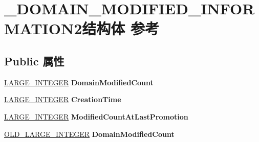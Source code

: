 \hypertarget{struct___d_o_m_a_i_n___m_o_d_i_f_i_e_d___i_n_f_o_r_m_a_t_i_o_n2}{}\section{\+\_\+\+D\+O\+M\+A\+I\+N\+\_\+\+M\+O\+D\+I\+F\+I\+E\+D\+\_\+\+I\+N\+F\+O\+R\+M\+A\+T\+I\+O\+N2结构体 参考}
\label{struct___d_o_m_a_i_n___m_o_d_i_f_i_e_d___i_n_f_o_r_m_a_t_i_o_n2}
\subsection*{Public 属性}
\begin{DoxyCompactItemize}
\item 
\mbox{\label{struct___d_o_m_a_i_n___m_o_d_i_f_i_e_d___i_n_f_o_r_m_a_t_i_o_n2_a7c1eada0462e6a7104e068ecc3f34dbd}} 
\hyperlink{union___l_a_r_g_e___i_n_t_e_g_e_r}{L\+A\+R\+G\+E\+\_\+\+I\+N\+T\+E\+G\+ER} {\bfseries Domain\+Modified\+Count}
\item 
\mbox{\label{struct___d_o_m_a_i_n___m_o_d_i_f_i_e_d___i_n_f_o_r_m_a_t_i_o_n2_a9a89897af1314d64237f343ab8f1d6cf}} 
\hyperlink{union___l_a_r_g_e___i_n_t_e_g_e_r}{L\+A\+R\+G\+E\+\_\+\+I\+N\+T\+E\+G\+ER} {\bfseries Creation\+Time}
\item 
\mbox{\label{struct___d_o_m_a_i_n___m_o_d_i_f_i_e_d___i_n_f_o_r_m_a_t_i_o_n2_a7f5bb9fc27370f50e2a3e39c98e76bca}} 
\hyperlink{union___l_a_r_g_e___i_n_t_e_g_e_r}{L\+A\+R\+G\+E\+\_\+\+I\+N\+T\+E\+G\+ER} {\bfseries Modified\+Count\+At\+Last\+Promotion}
\item 
\mbox{\label{struct___d_o_m_a_i_n___m_o_d_i_f_i_e_d___i_n_f_o_r_m_a_t_i_o_n2_a126b634d4c6595a07de8e2f40e2858f9}} 
\hyperlink{struct___o_l_d___l_a_r_g_e___i_n_t_e_g_e_r}{O\+L\+D\+\_\+\+L\+A\+R\+G\+E\+\_\+\+I\+N\+T\+E\+G\+ER} {\bfseries Domain\+Modified\+Count}
\item 
\mbox{\label{struct___d_o_m_a_i_n___m_o_d_i_f_i_e_d___i_n_f_o_r_m_a_t_i_o_n2_a1157139868871be3407e85a756143354}} 

\end{DoxyCompactItemize}
